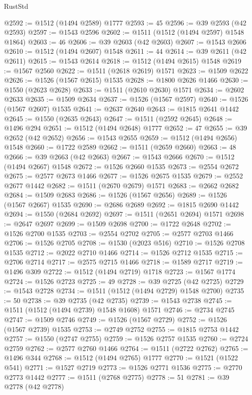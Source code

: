 \begin{lexlean}{RustStd}
\begin{coremodule}
{{@2592 := @1512 (@1494 @2589) @1777
@2593 := 45
@2596 := @39 @2593 (@42 @2593)
@2597 := @1543 @2596
@2602 := @1511 (@1512 (@1494 @2597) @1548 @1864)
@2603 := 46
@2606 := @39 @2603 (@42 @2603)
@2607 := @1543 @2606
@2610 := @1512 (@1494 @2607) @1548
@2611 := 44
@2614 := @39 @2611 (@42 @2611)
@2615 := @1543 @2614
@2618 := @1512 (@1494 @2615) @1548
@2619 := @1567 @2560
@2622 := @1511 (@2618 @2619) @1571
@2623 := @1509 @2622
@2626 := @1526 (@1567 @2615) @1535
@2628 := @1800 @2626 @1466
@2630 := @1550 (@2623 @2628)
@2633 := @1511 (@2610 @2630) @1571
@2634 := @2602 @2633
@2635 := @1509 @2634
@2637 := @1526 (@1567 @2597)
@2640 := @1526 (@1567 @2607) @1535
@2641 := @2637 @2640
@2643 := @1815 @2641 @1442
@2645 := @1550 (@2635 @2643)
@2647 := @1511 (@2592 @2645)
@2648 := @1496 @294
@2651 := @1512 (@1494 @2648) @1777
@2652 := 47
@2655 := @39 @2652 (@42 @2652)
@2656 := @1543 @2655
@2659 := @1512 (@1494 @2656) @1548
@2660 := @1722 @2589
@2662 := @1511 (@2659 @2660)
@2663 := 48
@2666 := @39 @2663 (@42 @2663)
@2667 := @1543 @2666
@2670 := @1512 (@1494 @2667) @1548
@2672 := @1526 @2660 @1535
@2673 := @2554 @2672
@2675 := @2577 @2673 @1466
@2677 := @1526 @2675 @1535
@2679 := @2552 @2677 @1442
@2682 := @1511 (@2670 @2679) @1571
@2683 := @2662 @2682
@2684 := @1509 @2683
@2686 := @1526 (@1567 @2656)
@2689 := @1526 (@1567 @2667) @1535
@2690 := @2686 @2689
@2692 := @1815 @2690 @1442
@2694 := @1550 (@2684 @2692)
@2697 := @1511 (@2651 @2694) @1571
@2698 := @2647 @2697
@2699 := @1509 @2698
@2700 := @1722 @2648
@2702 := @1526 @2700 @1535
@2703 := @2554 @2702
@2705 := @2577 @2703 @1466
@2706 := @1526 @2705
@2708 := @1530 (@2023 @516)
@2710 := @1526 @2708 @1535
@2712 := @2022 @2710 @1466
@2714 := @1526 @2712 @1535
@2715 := @2706 @2714
@2717 := @2575 @2715 @1466
@2718 := @1589 @2717
@2719 := @1496 @309
@2722 := @1512 (@1494 @2719) @1718
@2723 := @1567 @1774
@2724 := @1526 @2723
@2725 := 49
@2728 := @39 @2725 (@42 @2725)
@2729 := @1543 @2728
@2734 := @1511 (@1512 (@1494 @2729) @1548 @2700)
@2735 := 50
@2738 := @39 @2735 (@42 @2735)
@2739 := @1543 @2738
@2745 := @1511 (@1512 (@1494 @2739) @1548 @1608) @1571
@2746 := @2734 @2745
@2747 := @1509 @2746
@2749 := @1526 (@1567 @2729)
@2752 := @1526 (@1567 @2739) @1535
@2753 := @2749 @2752
@2755 := @1815 @2753 @1442
@2757 := @1550 (@2747 @2755)
@2759 := @1526 @2757 @1535
@2760 := @2724 @2759
@2762 := @2577 @2760 @1466
@2764 := @1511 (@2722 @2762)
@2765 := @1496 @344
@2768 := @1512 (@1494 @2765) @1777
@2770 := @1521 (@1522 @541)
@2771 := @1527 @2719
@2773 := @1526 @2771 @1536
@2775 := @2770 @2773 @1442
@2777 := @1511 (@2768 @2775)
@2778 := 51
@2781 := @39 @2778 (@42 @2778)
}}
\end{coremodule}
\end{lexlean}
